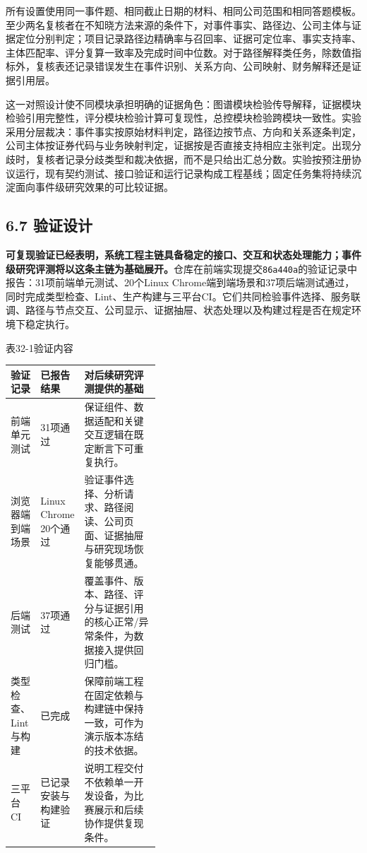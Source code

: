 所有设置使用同一事件题、相同截止日期的材料、相同公司范围和相同答题模板。至少两名复核者在不知晓方法来源的条件下，对事件事实、路径边、公司主体与证据定位分别判定；项目记录路径边精确率与召回率、证据可定位率、事实支持率、主体匹配率、评分复算一致率及完成时间中位数。对于路径解释类任务，除数值指标外，复核表还记录错误发生在事件识别、关系方向、公司映射、财务解释还是证据引用层。

这一对照设计使不同模块承担明确的证据角色：图谱模块检验传导解释，证据模块检验引用完整性，评分模块检验计算可复现性，总控模块检验跨模块一致性。实验采用分层裁决：事件事实按原始材料判定，路径边按节点、方向和关系逐条判定，公司主体按证券代码与业务映射判定，证据按是否直接支持相应主张判定。出现分歧时，复核者记录分歧类型和裁决依据，而不是只给出汇总分数。实验按预注册协议运行，现有契约测试、接口验证和运行记录构成工程基线；固定任务集将持续沉淀面向事件级研究效果的可比较证据。


\subsection*{6.7 验证设计}\label{page:32}
\noindent\textbf{可复现验证已经表明，系统工程主链具备稳定的接口、交互和状态处理能力；事件级研究评测将以这条主链为基础展开。}仓库在前端实现提交\texttt{86a440a}的验证记录中报告：31项前端单元测试、20个Linux Chrome端到端场景和37项后端测试通过，同时完成类型检查、Lint、生产构建与三平台CI。它们共同检验事件选择、服务联调、路径与节点交互、公司显示、证据抽屉、状态处理以及构建过程是否在规定环境下稳定执行\cite{lhy-repository,lhy-frontend}。

\begin{center}\small 表32-1\quad 验证内容\par\vspace{1mm}
\begin{tabularx}{\linewidth}{p{0.20\linewidth}p{0.22\linewidth}X}
\toprule
验证记录 & 已报告结果 & 对后续研究评测提供的基础\\
\midrule
前端单元测试 & 31项通过 & 保证组件、数据适配和关键交互逻辑在既定断言下可重复执行。\\
浏览器端到端场景 & Linux Chrome 20个通过 & 验证事件选择、分析请求、路径阅读、公司页面、证据抽屉与研究现场恢复能够贯通。\\
后端测试 & 37项通过 & 覆盖事件、版本、路径、评分与证据引用的核心正常/异常条件，为数据接入提供回归门槛。\\
类型检查、Lint与构建 & 已完成 & 保障前端工程在固定依赖与构建链中保持一致，可作为演示版本冻结的技术依据。\\
三平台CI & 已记录安装与构建验证 & 说明工程交付不依赖单一开发设备，为比赛展示和后续协作提供复现条件。\\
\bottomrule
\end{tabularx}\end{center}

